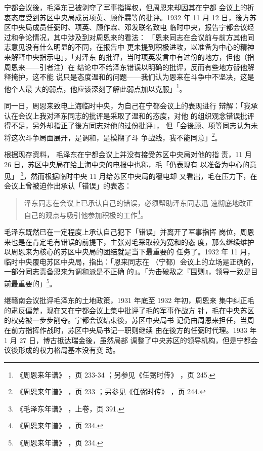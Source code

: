 宁都会议後，毛泽东已被剥夺了军事指挥权，但周恩来却因其在宁都
会议上的折衷态度受到苏区中央局成员项英、顾作霖等的批评。1932 年
11 月 12 日，後方苏区中央局成员任弼时、项英、顾作霖、邓发联名致电
临时中央，报告宁都会议经过和争论情况，其中涉及到对周恩来的看法：
「恩来同志在会议前与前方其他同志意见没有什么明显的不同，在报告中
更未提到积极进攻，以准备为中心的精神来解释中央指示电」，「对泽东
的批评，当时项英发言中有过份的地方，但他（指周恩来——引者注）在
结论中不给泽东错误以明确的批评，反而有些地方替他解释掩护，这不能
说只是态度温和的问题——我们认为恩来在斗争中不坚决，这是他个人最
大的弱点，他应该深刻了解此弱点加以克服」\footnote{《周恩来年谱》
，页 233-34 ；另参见《任弼时传》
，页 245.}。

同一日，周恩来致电上海临时中央，为自己在宁都会议上的表现进行
辩解：「我承认在会议上我对泽东同志的批评是采取了温和的态度，对他
的组织观念错误批评得不足，另外却指正了後方同志对他的过份批评」，
但「会後顾、项等同志认为未将这次斗争局面展开，是调和，是模糊了斗
争战线，我不能同意」\footnote{《周恩来年谱》
，页 233 ；另参见《任弼时传》
，页 244.}。

根据现存资料，
毛泽东在宁都会议上并没有接受苏区中央局对他的指
责，11 月 26 日，苏区中央局在给上海中央的电报中也称，毛「仍表现有
以准备为中心的意见」 \footnote{《毛泽东年谱》
，上卷，页 391.}，然而根据临时中央 11 月给苏区中央局的覆电却
又看出，毛在压力下，在会议上曾被迫作出承认「错误」的表态：
\begin{quote}
	\fzwkai 泽东同志在会议上已承认自己的错误，必须帮助泽东同志迅
速彻底地改正自己的观点与吸引他参加积极的工作\footnote{ 《周恩来年谱》
，页 234. }。
\end{quote}
 
毛泽东既然已在一定程度上承认自己犯下「错误」并离开了军事指挥
岗位，周恩来也是在肯定毛有错误的前提下，主张对毛采取较为宽和的态
度，那么继续维护以周恩来为核心的苏区中央局的团结就是当下最重要的
任务了。1932 年 11 月，临时中央覆电苏区中央局，指出：「恩来同志在
（宁都）会议上的立场是正确的，一部分同志责备恩来为调和派是不正确
的」。「为击破敌之『围剿』，领导一致是目前最重要的」\footnote{ 《周恩来年谱》
，页 234.}。

继赣南会议批评毛泽东的土地政策，1931 年底至 1932 年初，周恩来
集中纠正毛的肃反偏差，现在又在宁都会议上集中批评了毛的军事作战方
针，毛在中央苏区的权势被一步步削夺。宁都会议结束後，苏区中央局书
记仍由周恩来担任，当周在前方指挥作战时，苏区中央局书记一职则继续
由在後方的任弼时代理。1933 年 1 月 27 日，博古抵达瑞金後，虽然局部
调整了中央苏区的领导机构，但是宁都会议後形成的权力格局基本没有变
动。

